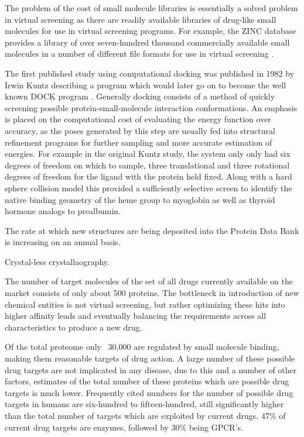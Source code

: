 The problem of the cost of small molecule libraries is essentially a solved problem in virtual screening as there are readily available libraries of drug-like small molecules for use in virtual screening programs.
For example, the ZINC database provides a library of over seven-hundred thousand commercially available small molecules in a number of different file formats for use in virtual screening \cite{irwin2005zinc}.

\cite{kitchen2004docking}

The first published study using computational docking was published in 1982 by Irwin Kuntz describing a program which would later go on to become the well known DOCK program  \cite{kuntz1982geometric}.
Generally docking consists of a method of quickly screening possible protein-small-molecule interaction conformations.
An emphasis is placed on the computational cost of evaluating the energy function over accuracy, as the poses generated by this step are usually fed into structural refinement programs for further sampling and more accurate estimation of energies.
For example in the original Kuntz study, the system only only had six degrees of freedom on which to sample, three translational and three rotational degrees of freedom for the ligand with the protein held fixed.
Along with a hard sphere collision model this provided a sufficiently selective screen to identify the native binding geometry of the heme group to myoglobin as well as thyroid hormone analogs to prealbumin. 
\cite{kuntz1982geometric}

The rate at which new structures are being deposited into the Protein Data Bank is increasing on an annual basis.

Crystal-less crystallaography.
\cite{inokuma2013x}

The number of target molecules of the set of all drugs currently available on the market consists of only about 500 proteins.
The bottleneck in introduction of new chemical entities is not virtual screening, but rather optimizing these hits into higher affinity leads and eventually balancing the requirements across all characteristics to produce a new drug.
\cite{bleicher2003hit}

Of the total proteome only ~30,000 are regulated by small molecule binding, making them reasonable targets of drug action.
A large number of these possible drug targets are not implicated in any disease, due to this and a number of other factors, estimates of the total number of these proteins which are possible drug targets is much lower.
Frequently cited numbers for the number of possible drug targets in humans are six-hundred to fifteen-hundred, still significantly higher than the total number of targets which are exploited by current drugs.
47\% of current drug targets are enzymes, followed by 30\% being GPCR's.
\cite{hopkins2002druggable}

